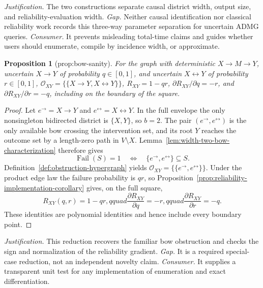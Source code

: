 \documentclass{article}
\newtheorem{proposition}{Proposition}
\begin{document}
\par\smallskip\noindent \textit{Justification.} The two constructions separate causal district width, output size, and reliability-evaluation width. \textit{Gap.} Neither causal identification nor classical reliability work records this three-way parameter separation for uncertain ADMG queries. \textit{Consumer.} It prevents misleading total-time claims and guides whether users should enumerate, compile by incidence width, or approximate.

\begin{proposition}[prop:bow-sanity]\label{prop:bow-sanity}
For the graph with deterministic \(X\to M\to Y\), uncertain \(X\to Y\) of probability \(q\in[0,1]\), and uncertain \(X\leftrightarrow Y\) of probability \(r\in[0,1]\), \(\mathcal O_{XY}=\{\{X\to Y,X\leftrightarrow Y\}\}\), \(R_{XY}=1-qr\), \(\partial R_{XY}/\partial q=-r\), and \(\partial R_{XY}/\partial r=-q\), including on the boundary of the square.
\end{proposition}
\begin{proof}
Let \(e^{\to}=X\to Y\) and \(e^{\leftrightarrow}=X\leftrightarrow Y\).  In the full envelope the only nonsingleton bidirected district is \(\{X,Y\}\), so \(b=2\).  The pair \((e^{\to},e^{\leftrightarrow})\) is the only available bow crossing the intervention set, and its root \(Y\) reaches the outcome set by a length-zero path in \(V\setminus X\).  Lemma~\ref{lem:width-two-bow-characterization} therefore gives
\[
 \operatorname{Fail}(S)=1
 \quad\Longleftrightarrow\quad
 \{e^{\to},e^{\leftrightarrow}\}\subseteq S.
\]
Definition~\ref{def:obstruction-hypergraph} yields
\(
\mathcal O_{XY}=\{\{e^{\to},e^{\leftrightarrow}\}\}
\).  Under the product edge law the failure probability is \(qr\), so Proposition~\ref{prop:reliability-implementation-corollary} gives, on the full square,
\[
 R_{XY}(q,r)=1-qr,qquad
 \frac{\partial R_{XY}}{\partial q}=-r,qquad
 \frac{\partial R_{XY}}{\partial r}=-q.
\]
These identities are polynomial identities and hence include every boundary point.
\end{proof}
\par\smallskip\noindent \textit{Justification.} This reduction recovers the familiar bow obstruction and checks the sign and normalization of the reliability gradient. \textit{Gap.} It is a required special-case reduction, not an independent novelty claim. \textit{Consumer.} It supplies a transparent unit test for any implementation of enumeration and exact differentiation.
\end{document}
